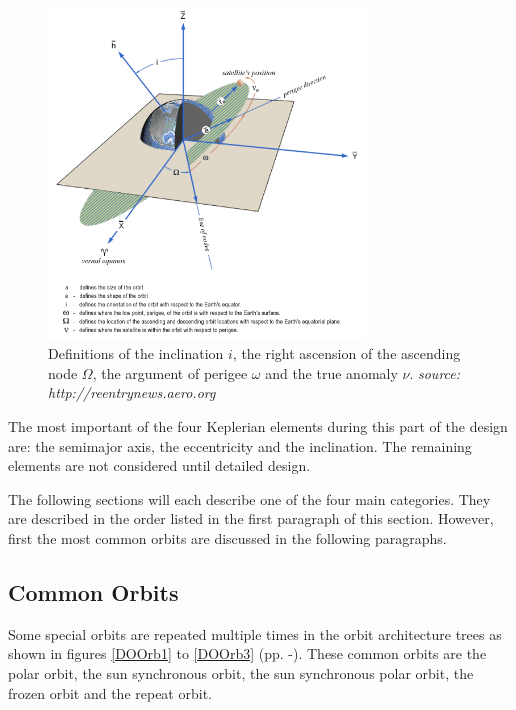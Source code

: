 \begin{figure} [ht]
	\begin{center}
         \includegraphics[width=0.75\textwidth,angle=0]{chapters/img/OrbElements.png}
	\caption{Definitions of the inclination $i$, the right ascension of the ascending node $\Omega$, the argument of perigee $\omega$ and the true anomaly $\nu$. \emph{source: http://reentrynews.aero.org}}
	\label{OrbElements}
	\end{center}
	\end{figure}
The most important of the four Keplerian elements during this part of the design are: the semimajor axis, the eccentricity and the inclination. The remaining elements are not considered until detailed design.

The following sections will each describe one of the four main categories. They are described in the order listed in the first paragraph of this section. However, first the most common orbits are discussed in the following paragraphs.

\subsection {Common Orbits}
\label{sec:blOrbCommon}
Some special orbits are repeated multiple times in the orbit architecture trees as shown in figures \ref{DOOrb1} to \ref{DOOrb3} (pp. \pageref{DOOrb1}-\pageref{DOOrb1}). These common orbits are the polar orbit, the sun synchronous orbit, the sun synchronous polar orbit, the frozen orbit and the repeat orbit.

